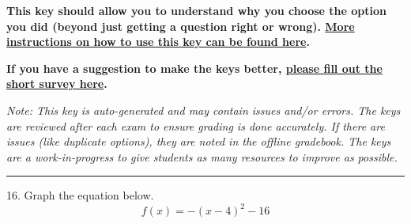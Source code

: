 \documentclass{extbook}[14pt]
\begin{document}
\textbf{This key should allow you to understand why you choose the option you did (beyond just getting a question right or wrong). \href{https://xronos.clas.ufl.edu/mac1105spring2020/courseDescriptionAndMisc/Exams/LearningFromResults}{More instructions on how to use this key can be found here}.}

\textbf{If you have a suggestion to make the keys better, \href{https://forms.gle/CZkbZmPbC9XALEE88}{please fill out the short survey here}.}

\textit{Note: This key is auto-generated and may contain issues and/or errors. The keys are reviewed after each exam to ensure grading is done accurately. If there are issues (like duplicate options), they are noted in the offline gradebook. The keys are a work-in-progress to give students as many resources to improve as possible.}

\rule{\textwidth}{0.4pt}

16. Graph the equation below.
\[ f(x) = -(x-4)^2 - 16 \] 
\end{document}
